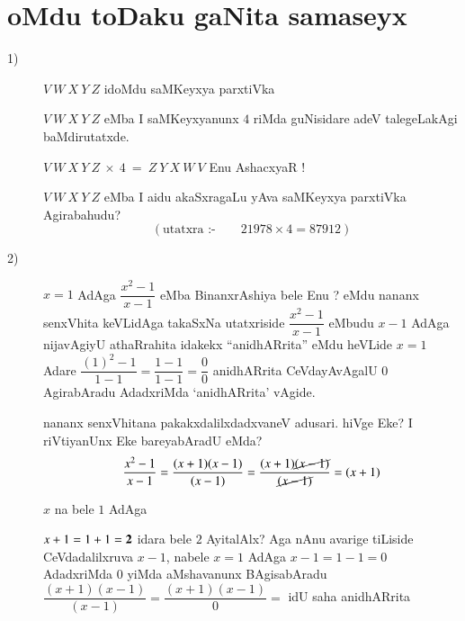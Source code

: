 \chapter{oMdu toDaku gaNita samaseyx}

\begin{description}
\item[{\rm 1)}] $V ~W ~X ~Y ~Z$ idoMdu saMKeyxya parxtiVka

  $V ~W ~X ~Y ~Z$ eMba I saMKeyxyanunx $4$ riMda guNisidare adeV talegeLakAgi baMdirutatxde.

  $V ~W ~X ~Y ~Z ~ \times ~4 ~= ~Z ~Y~X~W~V$ Enu AshacxyaR !

  $V ~W ~X ~Y ~Z$ eMba I aidu akaSxragaLu yAva saMKeyxya parxtiVka Agirabahudu?
  $$
(\text{utatxra :-}\qquad  21978 \times 4 = 87912)
  $$
  
\item[{\rm 2)}] $x=1$ AdAga $\dfrac{x^2-1}{x-1}$ eMba BinanxrAshiya bele Enu ? eMdu nananx senxVhita keVLidAga takaSxNa utatxriside $\dfrac{x^2-1}{x-1}$ eMbudu $x-1$ AdAga nijavAgiyU athaRrahita idakekx ``anidhARrita'' eMdu heVLide $x=1$ Adare $\dfrac{(1)^2 -1}{1-1} = \dfrac{1-1}{1-1} = \dfrac{0}{0}$ anidhARrita CeVdayAvAgalU $0$ AgirabAradu AdadxriMda `anidhARrita' vAgide.

  nananx senxVhitana pakakxdalilxdadxvaneV adusari. hiVge Eke? I riVtiyanUnx Eke bareyabAradU eMda?
  $$
  \frac{x^2-1}{x-1} = \frac{(x+1)(x-1)}{(x-1)} = \frac{(x+1)\cancel{(x-1)}}{\cancel{(x-1)}} = (x+1)
  $$

  $x$ na bele $1$ AdAga
  
  $x+1 =1+1 ={\bf 2}$ idara bele $2$ AyitalAlx? Aga nAnu avarige tiLiside CeVdadalilxruva $x-1$, nabele $x=1$ AdAga $x-1=1-1=0$ AdadxriMda $0$ yiMda aMshavanunx BAgisabAradu $\dfrac{(x+1)(x-1)}{(x-1)} = \dfrac{(x+1)(x-1)}{0} =$ idU saha anidhARrita
\end{description}
